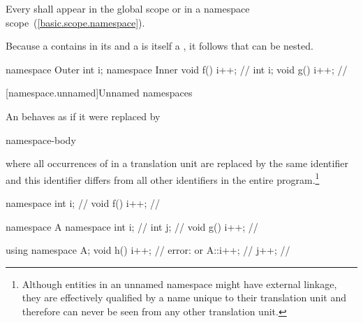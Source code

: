 \pnum
Every  shall appear in the global scope
or in a namespace scope~(\ref{basic.scope.namespace}).

\pnum
Because a  contains
 in its  and a
 is itself a , it
follows that  can be nested.
\enterexample

\begin{codeblock}
namespace Outer {
	int i;
	namespace Inner {
		void f() { i++; }       // 
		int i;
		void g() { i++; }       // 
	}
}
\end{codeblock}
\exitexampleb

[namespace.unnamed]{Unnamed namespaces}%

\pnum
An  behaves as if it were
replaced by

\begin{ncsimplebnf}
 \uniquens {}\br
{} \uniquens \terminal{;}\br
{} \uniquens \terminal{\{} namespace-body \terminal{\}}
\end{ncsimplebnf}

where all occurrences of \uniquens in a translation unit are replaced by
the same identifier and this identifier differs from all other
identifiers in the entire program.\footnote{Although entities in an unnamed
namespace might have external linkage,
they are effectively qualified by a name unique to their translation
unit and therefore can never be seen from any other translation unit.}
\enterexample

\begin{codeblock}
namespace { int i; }            // \uniquens {}
void f() { i++; }               // \uniquens {}

namespace A {
	namespace {
		int i;          //  \uniquens {}
		int j;          //  \uniquens {}
	}
	void g() { i++; }       //  \uniquens {}
}

using namespace A;
void h() {
	i++;                    // error: \uniquens {} or  \uniquens {}
	A::i++;                 //  \uniquens {}
	j++;                    //  \uniquens {}
}
\end{codeblock}
\exitexampleb

